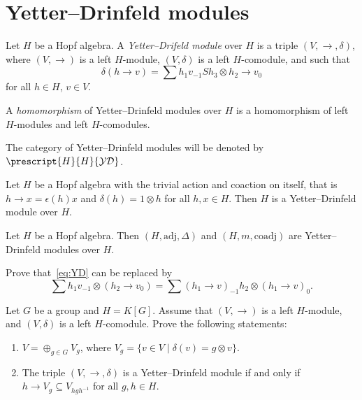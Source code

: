 \documentclass[12pt]{amsproc}
\newcommand{\ydH}{\prescript{H}{H}{\mathcal{YD}}}
\begin{document}
\section{Yetter--Drinfeld modules}

\begin{definition}
Let $H$ be a Hopf algebra. A \emph{Yetter--Drifeld module} over $H$ is a
triple $(V,\rightarrow,\delta)$, where $(V,\rightarrow)$ is a left $H$-module,
$(V,\delta)$ is a left $H$-comodule, and such that 
\begin{equation}
\delta(h\rightarrow v)=\sum h_{1}v_{-1}Sh_{3}\otimes h_{2}\rightarrow v_{0}\label{eq:YD}
\end{equation}
for all $h\in H$, $v\in V$. 
\end{definition}

\begin{definition}
A \emph{homomorphism} of Yetter--Drinfeld modules over $H$ 
is a homomorphism of left $H$-modules and left $H$-comodules. 
\end{definition}

The category of Yetter--Drinfeld
modules will be denoted by $\ydH$.

\begin{example}
Let $H$ be a Hopf algebra with the trivial action and coaction on itself, that is 
$h\rightarrow x=\epsilon(h)x$ and $\delta(h)=1\otimes h$ for all $h,x\in H$.
Then $H$ is a Yetter--Drinfeld module over $H$.
\end{example}

\begin{example}
Let $H$ be a Hopf algebra. Then $(H,\mathrm{adj},\Delta)$ and
$(H,m,\mathrm{coadj})$ are Yetter--Drinfeld modules over $H$.
\end{example}

\begin{exercise}
\label{xca:YD_condition}
Prove that~\eqref{eq:YD} can be replaced by 
\begin{equation}
\label{eq:left_left_YD_equivalent}
\sum h_{1}v_{-1}\otimes(h_{2}\rightarrow v_{0})
=\sum (h_{1}\rightarrow v)_{-1}h_{2}\otimes(h_{1}\rightarrow v)_{0}.
\end{equation}
\end{exercise}

\begin{exercise}
Let $G$ be a group and $H=K[G]$. Assume that
$(V,\rightarrow)$ is a left $H$-module, and $(V,\delta)$ is a left
$H$-comodule. Prove the following statements:
\begin{enumerate}
\item $V=\oplus_{g\in G}V_{g}$, where $V_{g}=\{v\in V\mid\delta(v)=g\otimes v\}$.  
\item The triple $(V,\rightarrow,\delta)$ is a Yetter--Drinfeld
module if and only if $h\rightarrow V_{g}\subseteq V_{hgh^{-1}}$ for all
$g,h\in H$.
\end{enumerate}
\end{exercise}
\end{document}
